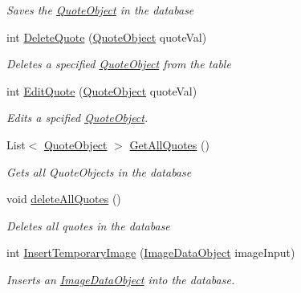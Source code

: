 \begin{DoxyCompactItemize}
\begin{DoxyCompactList}\small\item\em Saves the \hyperlink{class_intention_journal_1_1_quote_object}{Quote\+Object} in the database \end{DoxyCompactList}\item 
int \hyperlink{class_intention_journal_1_1_app_database_a46575d566d77e5e87c2070ef3b740123}{Delete\+Quote} (\hyperlink{class_intention_journal_1_1_quote_object}{Quote\+Object} quote\+Val)
\begin{DoxyCompactList}\small\item\em Deletes a specified \hyperlink{class_intention_journal_1_1_quote_object}{Quote\+Object} from the table \end{DoxyCompactList}\item 
int \hyperlink{class_intention_journal_1_1_app_database_afc282838226ca74ce6d570132fabea58}{Edit\+Quote} (\hyperlink{class_intention_journal_1_1_quote_object}{Quote\+Object} quote\+Val)
\begin{DoxyCompactList}\small\item\em Edits a spcified \hyperlink{class_intention_journal_1_1_quote_object}{Quote\+Object}. \end{DoxyCompactList}\item 
List$<$ \hyperlink{class_intention_journal_1_1_quote_object}{Quote\+Object} $>$ \hyperlink{class_intention_journal_1_1_app_database_a83cdd8b05dd4f11f2e27b03328bd5ef6}{Get\+All\+Quotes} ()
\begin{DoxyCompactList}\small\item\em Gets all Quote\+Objects in the database \end{DoxyCompactList}\item 
void \hyperlink{class_intention_journal_1_1_app_database_a2fc98eedc93868297f07968691dbdeed}{delete\+All\+Quotes} ()
\begin{DoxyCompactList}\small\item\em Deletes all quotes in the database \end{DoxyCompactList}\item 
int \hyperlink{class_intention_journal_1_1_app_database_ab5b4992848a3a24724176335ea1f02fd}{Insert\+Temporary\+Image} (\hyperlink{class_intention_journal_1_1_image_data_object}{Image\+Data\+Object} image\+Input)
\begin{DoxyCompactList}\small\item\em Inserts an \hyperlink{class_intention_journal_1_1_image_data_object}{Image\+Data\+Object} into the database. \end{DoxyCompactList}\item 

\end{DoxyCompactItemize}

